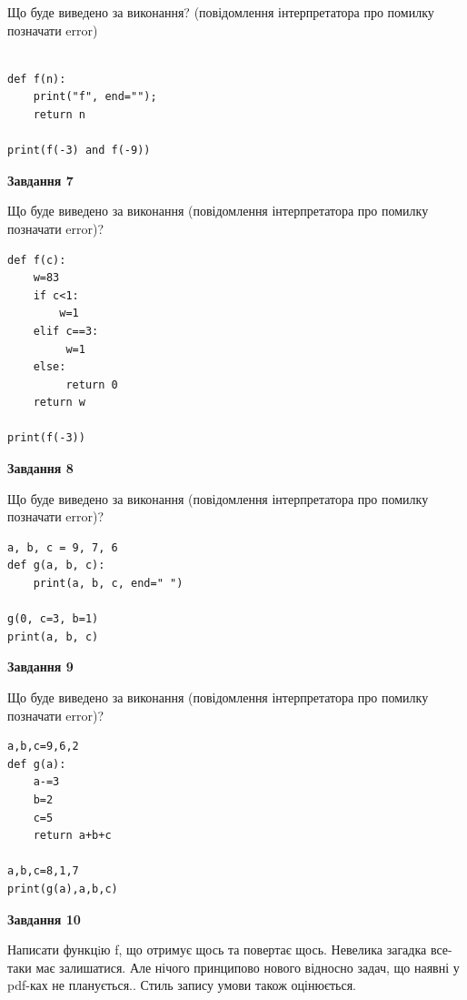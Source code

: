 \documentclass[12pt, ukrainian]{article}
\begin{document}
{\begin {large}
Що буде виведено за виконання? (повідомлення інтерпретатора про помилку позначати error)\par
\begin{verbatim}

def f(n):
    print("f", end="");
    return n

print(f(-3) and f(-9))
\end{verbatim}

{\begin {center}\textbf{Завдання 7}\end {center}}

Що буде виведено за виконання (повідомлення інтерпретатора про помилку позначати error)?\par
\begin{verbatim}
def f(c):
    w=83
    if c<1: 
        w=1
    elif c==3:
         w=1
    else:
         return 0
    return w

print(f(-3))
\end{verbatim}

{\begin {center}\textbf{Завдання 8}\end {center}}

Що буде виведено за виконання (повідомлення інтерпретатора про помилку позначати error)?\par
\begin{verbatim}
a, b, c = 9, 7, 6
def g(a, b, c):
    print(a, b, c, end=" ")

g(0, c=3, b=1)
print(a, b, c)
\end{verbatim}

{\begin {center}\textbf{Завдання 9}\end {center}}

Що буде виведено за виконання (повідомлення інтерпретатора про помилку позначати error)?\par
\begin{verbatim}
a,b,c=9,6,2
def g(a):
    a-=3
    b=2
    c=5
    return a+b+c

a,b,c=8,1,7
print(g(a),a,b,c)
\end{verbatim}

{\begin {center}\textbf{Завдання 10}\end {center}}


Написати функцiю f, що отримує щось та повертає щось. Невелика загадка все-таки має залишатися. Але нічого принципово нового відносно задач, що наявні у pdf-ках не планується.. Стиль запису умови також оцінюється.\par
\end {large}}
\newpage
\end{document}
